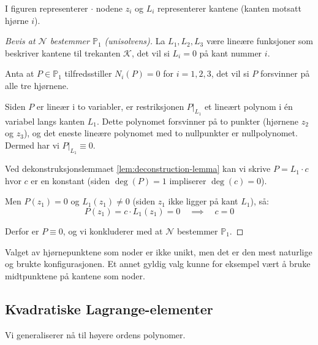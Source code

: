 \documentclass[../../main.tex]{subfiles}
\begin{document}
\begin{center}
 
\end{center}

I figuren representerer $\cdot$ nodene $z_i$ og $L_i$ representerer kantene (kanten motsatt hjørne $i$).

\begin{proof}[Bevis at $\mathcal{N}$ bestemmer $\mathbb{P}_1$ (unisolvens)]
La $L_1, L_2, L_3$ være lineære funksjoner som beskriver kantene til trekanten $\mathcal{K}$, det vil si $L_i = 0$ på kant nummer $i$.

Anta at $P \in \mathbb{P}_1$ tilfredsstiller $N_i(P) = 0$ for $i = 1, 2, 3$, det vil si $P$ forsvinner på alle tre hjørnene.

Siden $P$ er lineær i to variabler, er restriksjonen $P|_{L_1}$ et lineært polynom i én variabel langs kanten $L_1$. Dette polynomet forsvinner på to punkter (hjørnene $z_2$ og $z_3$), og det eneste lineære polynomet med to nullpunkter er nullpolynomet. Dermed har vi $P|_{L_1} \equiv 0$.

Ved dekonstruksjonslemmaet \ref{lem:deconstruction-lemma} kan vi skrive $P = L_1 \cdot c$ hvor $c$ er en konstant (siden $\deg(P) = 1$ impliserer $\deg(c) = 0$).

Men $P(z_1) = 0$ og $L_1(z_1) \neq 0$ (siden $z_1$ ikke ligger på kant $L_1$), så:
\[
    P(z_1) = c \cdot L_1(z_1) = 0 \quad \implies \quad c = 0
\]

Derfor er $P \equiv 0$, og vi konkluderer med at $\mathcal{N}$ bestemmer $\mathbb{P}_1$.
\end{proof}

\begin{remark}{}{}
Valget av hjørnepunktene som noder er ikke unikt, men det er den mest naturlige og brukte konfigurasjonen. Et annet gyldig valg kunne for eksempel vært å bruke midtpunktene på kantene som noder.
\end{remark}

\begin{center}
    
\end{center}

\subsection{Kvadratiske Lagrange-elementer}

Vi generaliserer nå til høyere ordens polynomer.
\end{document}
